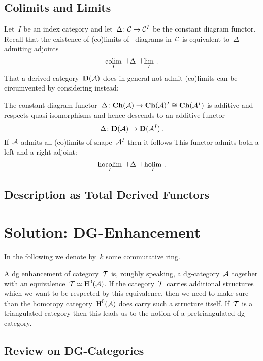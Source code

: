 \documentclass[a4paper,10pt]{scrartcl}
\begin{document}
\subsection{Colimits and Limits}

Let~$I$ be an index category and let~$\Delta \colon \mathcal{C} \to \mathcal{C}^I$ be the constant diagram functor.
Recall that the existence of (co)limits of~{} diagrams in~$\mathcal{C}$ is equivalent to~$\Delta$ admiting adjoints
\[
  \operatorname*{colim}_I \mathrel{\dashv} \Delta \mathrel{\dashv} \lim_I \,.
\]
That a derived category~$\mathbf{D}(\mathcal{A})$ does in general not admit (co)limits can be circumvented by considering  instead:

The constant diagram functor~$\Delta \colon \mathbf{Ch}(\mathcal{A}) \to \mathbf{Ch}(\mathcal{A})^I \cong \mathbf{Ch}(\mathcal{A}^I)$ is additive and respects quasi-isomorphisms and hence descends to an additive functor
\[
  \Delta
  \colon
  \mathbf{D}(\mathcal{A}) \to \mathbf{D}(\mathcal{A}^I) \,.
\]
If~$\mathcal{A}$ admits all (co)limits of shape~$\mathcal{A}^I$ then it follows 
This functor admits both a left and a right adjoint:
\[
  \operatorname*{hocolim}_I \mathrel{\dashv} \Delta \mathrel{\dashv} \operatorname*{holim}_I \,.
\]



\subsection{Description as Total Derived Functors}






\section{Solution: DG-Enhancement}

In the following we denote by~$k$ some commutative ring.

A dg enhancement of category~$\mathcal{T}$ is, roughly speaking, a dg-category~$\mathcal{A}$ together with an equivalence~$\mathcal{T} \simeq \operatorname{H}^0(\mathcal{A})$.
If the category~$\mathcal{T}$ carries additional structures which we want to be respected by this equivalence, then we need to make sure than the homotopy category~$\operatorname{H}^0(\mathcal{A})$ does carry such a structure itself.
If~$\mathcal{T}$ is a triangulated category then this leads us to the notion of a pretriangulated dg-category.



\subsection{Review on DG-Categories}
\end{document}
